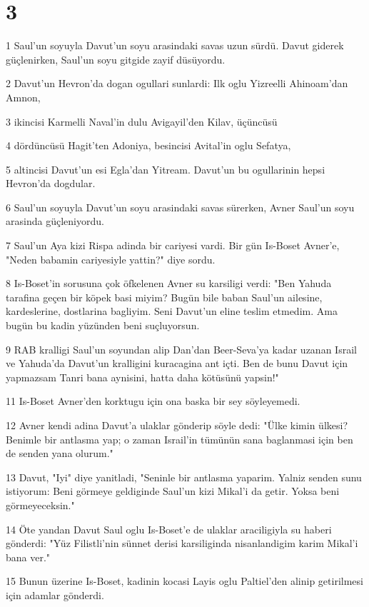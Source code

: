\chapter{3}

\par 1 Saul'un soyuyla Davut'un soyu arasindaki savas uzun sürdü. Davut giderek güçlenirken, Saul'un soyu gitgide zayif düsüyordu.
\par 2 Davut'un Hevron'da dogan ogullari sunlardi: Ilk oglu Yizreelli Ahinoam'dan Amnon,
\par 3 ikincisi Karmelli Naval'in dulu Avigayil'den Kilav, üçüncüsü
\par 4 dördüncüsü Hagit'ten Adoniya, besincisi Avital'in oglu Sefatya,
\par 5 altincisi Davut'un esi Egla'dan Yitream. Davut'un bu ogullarinin hepsi Hevron'da dogdular.
\par 6 Saul'un soyuyla Davut'un soyu arasindaki savas sürerken, Avner Saul'un soyu arasinda güçleniyordu.
\par 7 Saul'un Aya kizi Rispa adinda bir cariyesi vardi. Bir gün Is-Boset Avner'e, "Neden babamin cariyesiyle yattin?" diye sordu.
\par 8 Is-Boset'in sorusuna çok öfkelenen Avner su karsiligi verdi: "Ben Yahuda tarafina geçen bir köpek basi miyim? Bugün bile baban Saul'un ailesine, kardeslerine, dostlarina bagliyim. Seni Davut'un eline teslim etmedim. Ama bugün bu kadin yüzünden beni suçluyorsun.
\par 9 RAB kralligi Saul'un soyundan alip Dan'dan Beer-Seva'ya kadar uzanan Israil ve Yahuda'da Davut'un kralligini kuracagina ant içti. Ben de bunu Davut için yapmazsam Tanri bana aynisini, hatta daha kötüsünü yapsin!"
\par 11 Is-Boset Avner'den korktugu için ona baska bir sey söyleyemedi.
\par 12 Avner kendi adina Davut'a ulaklar gönderip söyle dedi: "Ülke kimin ülkesi? Benimle bir antlasma yap; o zaman Israil'in tümünün sana baglanmasi için ben de senden yana olurum."
\par 13 Davut, "Iyi" diye yanitladi, "Seninle bir antlasma yaparim. Yalniz senden sunu istiyorum: Beni görmeye geldiginde Saul'un kizi Mikal'i da getir. Yoksa beni görmeyeceksin."
\par 14 Öte yandan Davut Saul oglu Is-Boset'e de ulaklar araciligiyla su haberi gönderdi: "Yüz Filistli'nin sünnet derisi karsiliginda nisanlandigim karim Mikal'i bana ver."
\par 15 Bunun üzerine Is-Boset, kadinin kocasi Layis oglu Paltiel'den alinip getirilmesi için adamlar gönderdi.
